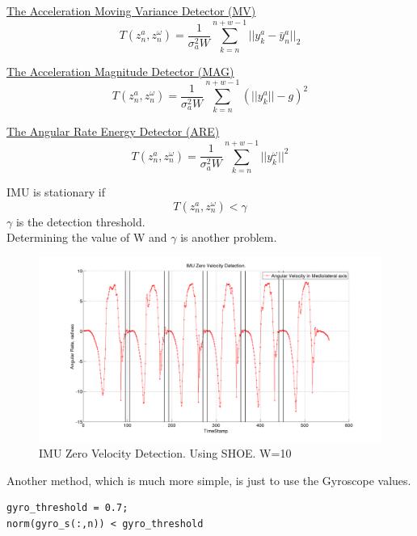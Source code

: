 \documentclass[12pt]{article}
\begin{document}
\underline{The Acceleration Moving Variance Detector (MV)}
\begin{equation}
T(z_n^a,z_n^{\omega})=\frac{1}{\sigma_a^2W} \sum_{k=n}^{n+w-1}||y_k^a-\bar{y}_n^a||_2
\end{equation}

\underline{The Acceleration Magnitude Detector (MAG)}
\begin{equation}
T(z_n^a,z_n^{\omega})=\frac{1}{\sigma_a^2W} \sum_{k=n}^{n+w-1}(||y_k^a||-g)^2
\end{equation}

\underline{The Angular Rate Energy Detector (ARE)}
\begin{equation}
T(z_n^a,z_n^{\omega})=\frac{1}{\sigma_a^2W} \sum_{k=n}^{n+w-1}||y_k^\omega||^2
\end{equation}

IMU is stationary if
\begin{equation}
T(z_n^a,z_n^{\omega})< \gamma
\end{equation}
$ \gamma $ is the detection threshold.\\
Determining the value of W and $ \gamma $ is another problem.

\begin{figure}[!htb]
\centering
\includegraphics[scale=.3]{imuzerovelocity.png}
\caption{IMU Zero Velocity Detection. Using SHOE. W=10}
\label{imuzerovelocity}
\end{figure}

\FloatBarrier

Another method, which is much more simple, is just to use the Gyroscope values.
\begin{verbatim}
gyro_threshold = 0.7;
norm(gyro_s(:,n)) < gyro_threshold
\end{verbatim}
\end{document}
